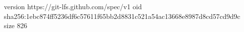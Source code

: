 version https://git-lfs.github.com/spec/v1
oid sha256:1ebc874ff5236df6c57611f65bb2d8831c521a54ac13668e8987d8cd57cd9d9c
size 826

